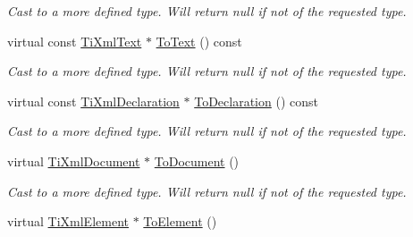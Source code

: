 \begin{DoxyCompactItemize}
\begin{DoxyCompactList}\small\item\em Cast to a more defined type. Will return null if not of the requested type. \item\end{DoxyCompactList}\item 
\hypertarget{class_ti_xml_node_a95a46a52c525992d6b4ee08beb14cd69}{
virtual const \hyperlink{class_ti_xml_text}{TiXmlText} $\ast$ \hyperlink{class_ti_xml_node_a95a46a52c525992d6b4ee08beb14cd69}{ToText} () const }
\label{class_ti_xml_node_a95a46a52c525992d6b4ee08beb14cd69}

\begin{DoxyCompactList}\small\item\em Cast to a more defined type. Will return null if not of the requested type. \item\end{DoxyCompactList}\item 
\hypertarget{class_ti_xml_node_a9f43e6984fc7d4afd6eb32714c6b7b72}{
virtual const \hyperlink{class_ti_xml_declaration}{TiXmlDeclaration} $\ast$ \hyperlink{class_ti_xml_node_a9f43e6984fc7d4afd6eb32714c6b7b72}{ToDeclaration} () const }
\label{class_ti_xml_node_a9f43e6984fc7d4afd6eb32714c6b7b72}

\begin{DoxyCompactList}\small\item\em Cast to a more defined type. Will return null if not of the requested type. \item\end{DoxyCompactList}\item 
\hypertarget{class_ti_xml_node_a6a4c8ac28ee7a745d059db6691e03bae}{
virtual \hyperlink{class_ti_xml_document}{TiXmlDocument} $\ast$ \hyperlink{class_ti_xml_node_a6a4c8ac28ee7a745d059db6691e03bae}{ToDocument} ()}
\label{class_ti_xml_node_a6a4c8ac28ee7a745d059db6691e03bae}

\begin{DoxyCompactList}\small\item\em Cast to a more defined type. Will return null if not of the requested type. \item\end{DoxyCompactList}\item 
\hypertarget{class_ti_xml_node_aa65d000223187d22a4dcebd7479e9ebc}{
virtual \hyperlink{class_ti_xml_element}{TiXmlElement} $\ast$ \hyperlink{class_ti_xml_node_aa65d000223187d22a4dcebd7479e9ebc}{ToElement} ()}
\label{class_ti_xml_node_aa65d000223187d22a4dcebd7479e9ebc}


\end{DoxyCompactItemize}
